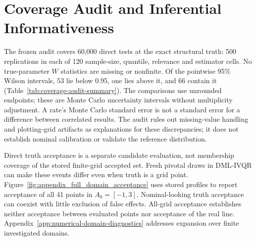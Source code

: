 \section{Coverage Audit and Inferential Informativeness}
\setcounter{equation}{0}\setcounter{table}{0}\setcounter{figure}{0}
\label{app:coverage-forensic-audit}
The frozen audit covers 60,000 direct tests at the exact structural truth: 500 replications in each of 120 sample-size, quantile, relevance and estimator cells. No true-parameter $W$ statistics are missing or nonfinite. Of the pointwise 95\% Wilson intervals, 53 lie below 0.95, one lies above it, and 66 contain it (Table~\ref{tab:coverage-audit-summary}). The comparisons use unrounded endpoints; these are Monte Carlo uncertainty intervals without multiplicity adjustment. A rate's Monte Carlo standard error is not a standard error for a difference between correlated results. The audit rules out missing-value handling and plotting-grid artifacts as explanations for these discrepancies; it does not establish nominal calibration or validate the reference distribution.


\FloatBarrier
Direct truth acceptance is a separate candidate evaluation, not membership coverage of the stored finite-grid accepted set. Fresh pivotal draws in DML-IVQR can make these events differ even when truth is a grid point. Figure~\ref{fig:appendix_full_domain_acceptance} uses stored profiles to report acceptance of all 41 points in $A_0=[-1,3]$. Nominal-looking truth acceptance can coexist with little exclusion of false effects. All-grid acceptance establishes neither acceptance between evaluated points nor acceptance of the real line. Appendix~\ref{app:numerical-domain-diagnostics} addresses expansion over finite investigated domains.

\FloatBarrier
\clearpage
